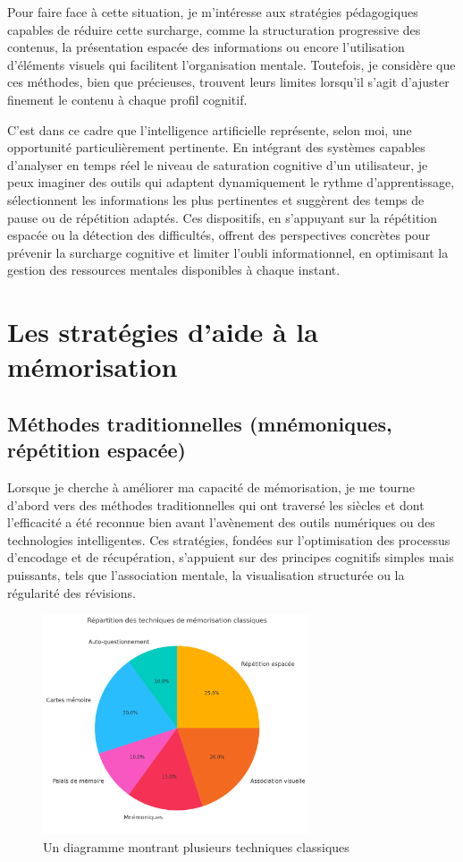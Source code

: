 \documentclass[11pt,a4paper]{report}
\begin{document}
Pour faire face à cette situation, je m’intéresse aux stratégies pédagogiques capables de réduire cette surcharge, comme la structuration progressive des contenus, la présentation espacée des informations ou encore l’utilisation d’éléments visuels qui facilitent l’organisation mentale. Toutefois, je considère que ces méthodes, bien que précieuses, trouvent leurs limites lorsqu’il s’agit d’ajuster finement le contenu à chaque profil cognitif.

C’est dans ce cadre que l’intelligence artificielle représente, selon moi, une opportunité particulièrement pertinente. En intégrant des systèmes capables d’analyser en temps réel le niveau de saturation cognitive d’un utilisateur, je peux imaginer des outils qui adaptent dynamiquement le rythme d’apprentissage, sélectionnent les informations les plus pertinentes et suggèrent des temps de pause ou de répétition adaptés. Ces dispositifs, en s’appuyant sur la répétition espacée ou la détection des difficultés, offrent des perspectives concrètes pour prévenir la surcharge cognitive et limiter l’oubli informationnel, en optimisant la gestion des ressources mentales disponibles à chaque instant.

\section{Les stratégies d’aide à la mémorisation}

\subsection{Méthodes traditionnelles (mnémoniques, répétition espacée)}

Lorsque je cherche à améliorer ma capacité de mémorisation, je me tourne d’abord vers des méthodes traditionnelles qui ont traversé les siècles et dont l’efficacité a été reconnue bien avant l’avènement des outils numériques ou des technologies intelligentes. Ces stratégies, fondées sur l’optimisation des processus d’encodage et de récupération, s’appuient sur des principes cognitifs simples mais puissants, tels que l’association mentale, la visualisation structurée ou la régularité des révisions.

\begin{figure}[h]
    \centering
    \includegraphics[width=0.7\textwidth]{images/1.3.1.png}
    \caption{Un diagramme montrant plusieurs techniques classiques}
    \label{fig:1.3.1}
\end{figure}
\end{document}
